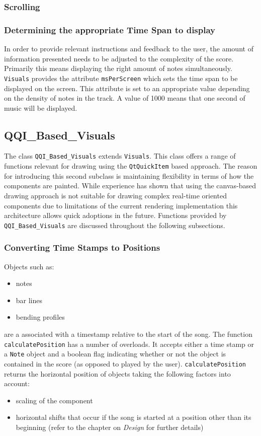 \subsubsection{Scrolling}
\subsubsection{Determining the appropriate Time Span to display}
In order to provide relevant instructions and feedback to the user, the amount of information presented needs to be adjusted to the complexity of the score. Primarily this means displaying the right amount of notes simultaneously.
{\tt Visuals} provides the attribute {\tt msPerScreen} which sets the time span to be displayed on the screen. This attribute is set to an appropriate value depending on the density of notes in the track. A value of 1000 means that one second of music will be displayed. 


\subsection{QQI\_Based\_Visuals}
The class {\tt QQI\_Based\_Visuals} extends {\tt Visuals}. This class offers a range of functions relevant for drawing using the {\tt QtQuickItem} based approach.
The reason for introducing this second subclass is maintaining flexibility in terms of how the components are painted. While experience has shown that using the canvas-based drawing approach is not suitable for drawing complex real-time oriented components due to limitations of the current rendering implementation this architecture allows quick adoptions in the future.
Functions provided by {\tt QQI\_Based\_Visuals} are discussed throughout the following subsections.

\subsubsection{Converting Time Stamps to Positions}
Objects such as:
\begin{itemize}
	\item{notes}
	\item{bar lines}
	\item{bending profiles}
\end{itemize}
are a associated with a timestamp relative to the start of the song.
The function {\tt calculatePosition} has a number of overloads. It accepts either a time stamp or a {\tt Note} object and a boolean flag indicating whether or not the object is contained in the score (as opposed to played by the user). {\tt calculatePosition} returns the horizontal position of objects taking the following factors into account:
\begin{itemize}
	\item{scaling of the component}
	\item{horizontal shifts that occur if the song is started at a position other than its beginning (refer to the chapter on \textit{Design} for further details)}
\end{itemize}

